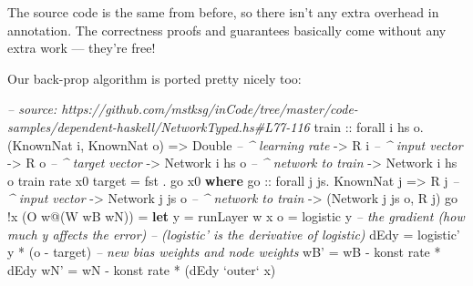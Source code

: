\documentclass[]{article}
\newenvironment{Shaded}{}{}
\newcommand{\KeywordTok}[1]{\textcolor[rgb]{0.00,0.44,0.13}{\textbf{#1}}}
\newcommand{\DataTypeTok}[1]{\textcolor[rgb]{0.56,0.13,0.00}{#1}}
\newcommand{\CommentTok}[1]{\textcolor[rgb]{0.38,0.63,0.69}{\textit{#1}}}
\newcommand{\OtherTok}[1]{\textcolor[rgb]{0.00,0.44,0.13}{#1}}
\newcommand{\FunctionTok}[1]{\textcolor[rgb]{0.02,0.16,0.49}{#1}}
\newcommand{\NormalTok}[1]{#1}
\begin{document}
The source code is the same from before, so there isn't any extra overhead in
annotation. The correctness proofs and guarantees basically come without any
extra work --- they're free!

Our back-prop algorithm is ported pretty nicely too:

\begin{Shaded}
\begin{Highlighting}[]
\CommentTok{-- source: https://github.com/mstksg/inCode/tree/master/code-samples/dependent-haskell/NetworkTyped.hs#L77-116}
\OtherTok{train ::}\NormalTok{ forall i hs o}\FunctionTok{.}\NormalTok{ (}\DataTypeTok{KnownNat}\NormalTok{ i, }\DataTypeTok{KnownNat}\NormalTok{ o)}
      \OtherTok{=>} \DataTypeTok{Double}           \CommentTok{-- ^ learning rate}
      \OtherTok{->} \DataTypeTok{R}\NormalTok{ i              }\CommentTok{-- ^ input vector}
      \OtherTok{->} \DataTypeTok{R}\NormalTok{ o              }\CommentTok{-- ^ target vector}
      \OtherTok{->} \DataTypeTok{Network}\NormalTok{ i hs o   }\CommentTok{-- ^ network to train}
      \OtherTok{->} \DataTypeTok{Network}\NormalTok{ i hs o}
\NormalTok{train rate x0 target }\FunctionTok{=}\NormalTok{ fst }\FunctionTok{.}\NormalTok{ go x0}
  \KeywordTok{where}
\OtherTok{    go  ::}\NormalTok{ forall j js}\FunctionTok{.} \DataTypeTok{KnownNat}\NormalTok{ j}
        \OtherTok{=>} \DataTypeTok{R}\NormalTok{ j              }\CommentTok{-- ^ input vector}
        \OtherTok{->} \DataTypeTok{Network}\NormalTok{ j js o   }\CommentTok{-- ^ network to train}
        \OtherTok{->}\NormalTok{ (}\DataTypeTok{Network}\NormalTok{ j js o, }\DataTypeTok{R}\NormalTok{ j)}
\NormalTok{    go }\FunctionTok{!}\NormalTok{x (}\DataTypeTok{O}\NormalTok{ w}\FunctionTok{@}\NormalTok{(}\DataTypeTok{W}\NormalTok{ wB wN))}
        \FunctionTok{=} \KeywordTok{let}\NormalTok{ y    }\FunctionTok{=}\NormalTok{ runLayer w x}
\NormalTok{              o    }\FunctionTok{=}\NormalTok{ logistic y}
              \CommentTok{-- the gradient (how much y affects the error)}
              \CommentTok{--   (logistic' is the derivative of logistic)}
\NormalTok{              dEdy }\FunctionTok{=}\NormalTok{ logistic' y }\FunctionTok{*}\NormalTok{ (o }\FunctionTok{-}\NormalTok{ target)}
              \CommentTok{-- new bias weights and node weights}
\NormalTok{              wB'  }\FunctionTok{=}\NormalTok{ wB }\FunctionTok{-}\NormalTok{ konst rate }\FunctionTok{*}\NormalTok{ dEdy}
\NormalTok{              wN'  }\FunctionTok{=}\NormalTok{ wN }\FunctionTok{-}\NormalTok{ konst rate }\FunctionTok{*}\NormalTok{ (dEdy }\OtherTok{`outer`}\NormalTok{ x)}

\end{Highlighting}
\end{Shaded}
\end{document}

